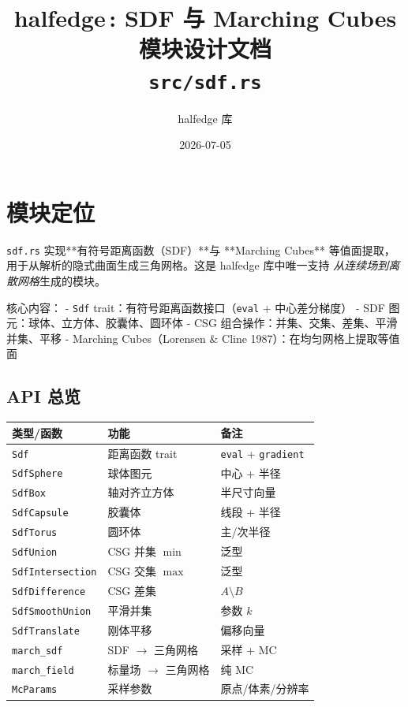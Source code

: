 \documentclass[11pt,a4paper]{article}
\title{\textbf{halfedge\,: SDF 与 Marching Cubes 模块设计文档} \\ \large \texttt{src/sdf.rs}}
\author{halfedge 库}
\date{2026-07-05}
\begin{document}
\maketitle
\tableofcontents

\section{模块定位}

\texttt{sdf.rs} 实现**有符号距离函数（SDF）**与 **Marching Cubes** 等值面提取，
用于从解析的隐式曲面生成三角网格。这是 halfedge 库中唯一支持
\emph{从连续场到离散网格}生成的模块。

核心内容：
- \texttt{Sdf} trait：有符号距离函数接口（\texttt{eval} + 中心差分梯度）
- SDF 图元：球体、立方体、胶囊体、圆环体
- CSG 组合操作：并集、交集、差集、平滑并集、平移
- Marching Cubes（Lorensen \& Cline 1987）：在均匀网格上提取等值面

\subsection{API 总览}

\begin{center}
\renewcommand{\arraystretch}{1.18}
\begin{tabular}{@{}lp{5.2cm}l@{}}
  \toprule
  \textbf{类型/函数} & \textbf{功能} & \textbf{备注} \\
  \midrule
  \texttt{Sdf} & 距离函数 trait & \texttt{eval} + \texttt{gradient} \\
  \texttt{SdfSphere} & 球体图元 & 中心 + 半径 \\
  \texttt{SdfBox} & 轴对齐立方体 & 半尺寸向量 \\
  \texttt{SdfCapsule} & 胶囊体 & 线段 + 半径 \\
  \texttt{SdfTorus} & 圆环体 & 主/次半径 \\
  \texttt{SdfUnion} & CSG 并集 $\min$ & 泛型 \\
  \texttt{SdfIntersection} & CSG 交集 $\max$ & 泛型 \\
  \texttt{SdfDifference} & CSG 差集 & $A \setminus B$ \\
  \texttt{SdfSmoothUnion} & 平滑并集 & 参数 $k$ \\
  \texttt{SdfTranslate} & 刚体平移 & 偏移向量 \\
  \texttt{march\_sdf} & SDF $\to$ 三角网格 & 采样 + MC \\
  \texttt{march\_field} & 标量场 $\to$ 三角网格 & 纯 MC \\
  \texttt{McParams} & 采样参数 & 原点/体素/分辨率 \\
  \bottomrule
\end{tabular}
\end{center}
\end{document}
